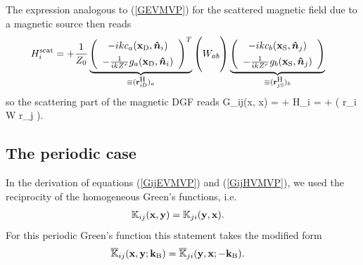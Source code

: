 \documentclass[letterpaper]{article}
\newcommand{\iD}{_{i\text{\tiny D}}}
\newcommand{\jS}{_{j\text{\tiny S}}}
\begin{document}
The expression analogous to (\ref{GEVMVP}) for the scattered
magnetic field due to a magnetic source then reads
\begin{align*}
 H\sups{scat}_i
&=+\frac{1}{Z_0}
  \underbrace{
  \left(\begin{array}{c} 
   -ik c_a(\vb x\subt{D}, \vbhat{n}_i)  \\[4pt]
   -\frac{1}{ik Z^r}  g_a(\vb x\subt{D}, \vbhat{n}_i)
  \end{array}\right)^T
             }_{\equiv (\vb r\supt{H}\iD)_a}
  \left(
 \vphantom{
  \left\{\begin{array}{c} 
     g_a(\vb x\subt{D}, \vbhat{n}_i) \\[4pt]
    -c_a(\vb x\subt{D}, \vbhat{n}_i) 
  \end{array}\right\}^T
          }
         W_{ab}
  \right)
  \underbrace{
  \left(\begin{array}{c} 
   -ik  c_b(\vb x\subt{S}, \vbhat{n}_j)  \\[4pt]
   -\frac{1}{ik Z^r} g_b(\vb x\subt{S}, \vbhat{n}_j)
  \end{array}\right)
             }_{\equiv (\vb r\supt{H}\jS)_b}
\end{align*}
so the scattering part of the magnetic DGF reads
{
 \mc G_{ij}(\vb x, \vb x)
= + H_i
= +
   \Big( \vb r\iD{} \cdot \vb W \cdot \vb r\jS{} \Big).
}

\subsection{The periodic case}

In the derivation of equations (\ref{GijEVMVP}) 
and (\ref{GijHVMVP}), we used the reciprocity of the 
homogeneous Green's functions, i.e.
\begin{align*}
 \mathbb{K}_{ij}(\mathbf{x}, \mathbf{y}) &= \mathbb{K}_{ji}(\mathbf{y}, \mathbf{x}).
\end{align*}
For this periodic Green's function this statement takes the 
modified form
\begin{align*}
 \overline{\mathbb{K}}_{ij}(\mathbf{x}, \mathbf{y}; \mathbf{k}_{\text{\scriptsize B}}) 
 &= \overline{\mathbb{K}}_{ji}(\mathbf{y}, \mathbf{x}; -\mathbf{k}_{\text{\scriptsize B}}).
\end{align*}
\end{document}
